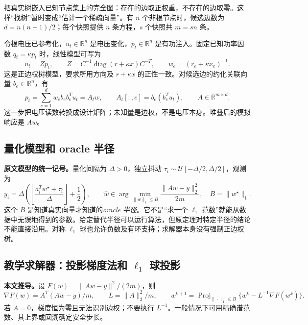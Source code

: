 \documentclass[UTF8,11pt,fontset=fandol,openany,oneside]{ctexbook}
\newcommand{\R}{\mathbb{R}}
\DeclareMathOperator{\diag}{diag}
\theoremstyle{definition}
\theoremstyle{remark}
\numberwithin{equation}{chapter}
\begin{document}
把真实树嵌入已知节点集上的完全图：存在的边取正权重，不存在的边取零。这样“找树”暂时变成“估计一个稀疏向量”。有 $n$ 个非根节点时，候选边数为 $d=n(n+1)/2$；每个快照提供 $n$ 条方程，$s$ 个快照共 $m=sn$ 条。

令根电压已参考化，$u_t\in\R^n$ 是电压变化，$p_t\in\R^n$ 是有功注入。固定已知功率因数 $q_t=\kappa p_t$ 时，线性模型可写为
\begin{equation}
 u_t=Zp_t,\qquad Z=C^{-1}\diag(r+\kappa x)C^{-T},\qquad
 w_e=(r_e+\kappa x_e)^{-1}.
 \label{eq:dq_s7_network}
\end{equation}
这是正边权树模型，要求所用方向及 $r+\kappa x$ 的正性一致。对候选边的约化关联向量 $b_e\in\R^n$，有
\begin{equation}
 p_t=\sum_{e=1}^d w_eb_eb_e^Tu_t=A_tw,\qquad
 A_t[:,e]=b_e(b_e^Tu_t),\qquad A\in\R^{m\times d}.
 \label{eq:dq_s7_design}
\end{equation}
这一步把电压读数转换成设计矩阵；未知量是边权，不是电压本身。堆叠后的模拟响应是 $Aw$。

\subsection{量化模型和 oracle 半径}

\textbf{原文模型的统一记号。}量化间隔为 $\Delta>0$，独立抖动
$\tau_i\sim\mathcal U[-\Delta/2,\Delta/2]$，观测为
\begin{equation}
 y_i=\Delta\left(\left\lfloor\frac{a_i^Tw^\star+\tau_i}{\Delta}\right\rfloor+\frac12\right),
 \qquad
 \hat w\in\arg\min_{\|w\|_1\le B}\frac{\|Aw-y\|_2^2}{2m},
 \quad B=\|w^\star\|_1.
 \label{eq:dq_s7_estimator}
\end{equation}
这个 $B$ 是知道真实向量才知道的\emph{oracle 半径}。它不是“求一个 $\ell_1$ 范数”就能从数据中无误地得到的参数。给定替代半径可以运行算法，但原定理对特定半径的结论不能直接沿用。对称 $\ell_1$ 球也允许负数及有环支持；求解器本身没有强制正边权树。

\subsection{教学求解器：投影梯度法和 \texorpdfstring{$\ell_1$}{l1} 球投影}

\textbf{本文推导。}设 $F(w)=\|Aw-y\|^2/(2m)$，则
\begin{equation}
 \nabla F(w)=A^T(Aw-y)/m,\qquad
 L=\|A\|_2^2/m,\qquad
 w^{k+1}=\operatorname{Proj}_{\|\cdot\|_1\le B}
                 \{w^k-L^{-1}\nabla F(w^k)\}.
 \label{eq:dq_s7_pg}
\end{equation}
若 $A=0$，梯度恒为零且无法识别边权；不要执行 $L^{-1}$。一般情况下可用精确谱范数、其上界或回溯确定安全步长。
\end{document}

